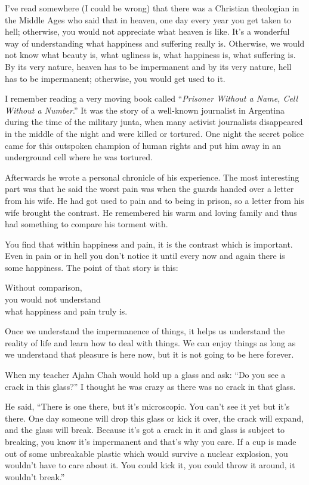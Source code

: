 \documentclass[12pt, openany]{book}
\newenvironment{aphorism}%
{%
\begin{center}\begin{itshape}
}%
{\end{itshape}\end{center}
}%
\begin{document}
I’ve read somewhere (I could be wrong) that there was a Christian theologian in the Middle Ages who said that in heaven, one day every year you get taken to hell; otherwise, you would not appreciate what heaven is like. It’s a wonderful way of understanding what happiness and suffering really is. Otherwise, we would not know what beauty is, what ugliness is, what happiness is, what suffering is. By its very nature, heaven has to be impermanent and by its very nature, hell has to be impermanent; otherwise, you would get used to it. 

I remember reading a very moving book called “\emph{Prisoner Without a Name, Cell Without a Number}.” It was the story of a well-known journalist in Argentina during the time of the military junta, when many activist journalists disappeared in the middle of the night and were killed or tortured. One night the secret police came for this outspoken champion of human rights and put him away in an underground cell where he was tortured. 

Afterwards he wrote a personal chronicle of his experience. The most interesting part was that he said the worst pain was when the guards handed over a letter from his wife. He had got used to pain and to being in prison, so a letter from his wife brought the contrast. He remembered his warm and loving family and thus had something to compare his torment with. 

You find that within happiness and pain, it is the contrast which is important. Even in pain or in hell you don’t notice it until every now and again there is some happiness. The point of that story is this: 

\begin{aphorism}
Without comparison,\\  
you would not understand\\ 
what happiness and pain truly is.
\end{aphorism}

Once we understand the impermanence of things, it helps us understand the reality of life and learn how to deal with things. We can enjoy things as long as we understand that pleasure is here now, but it is not going to be here forever. 

When my teacher Ajahn Chah would hold up a glass and ask: “Do you see a crack in this glass?” I thought he was crazy as there was no crack in that glass. 

He said, “There is one there, but it’s microscopic. You can’t see it yet but it’s there. One day someone will drop this glass or kick it over, the crack will expand, and the glass will break. Because it’s got a crack in it and glass is subject to breaking, you know it’s impermanent and that’s why you care. If a cup is made out of some unbreakable plastic which would survive a nuclear explosion, you wouldn’t have to care about it. You could kick it, you could throw it around, it wouldn’t break.” 
\end{document}
